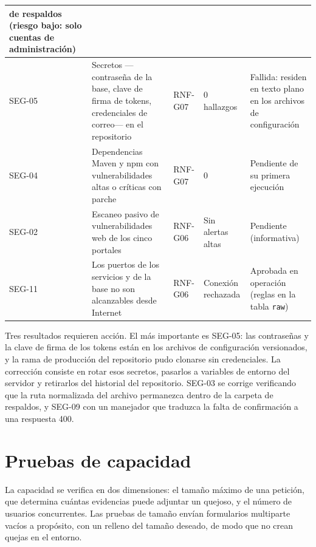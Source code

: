 \begin{longtable}{|p{1.2cm}|L{5.6cm}|L{2.2cm}|L{2.6cm}|L{2.9cm}|}
		de respaldos (riesgo bajo: solo cuentas de administración) \\ \hline
		SEG-05 & Secretos ---contraseña de la base, clave de firma de tokens, credenciales de correo--- en el
		repositorio & RNF-G07 & 0 hallazgos & Fallida: residen en texto plano en los archivos de
		configuración \\ \hline
		SEG-04 & Dependencias Maven y npm con vulnerabilidades altas o críticas con parche & RNF-G07 & 0 &
		Pendiente de su primera ejecución \\ \hline
		SEG-02 & Escaneo pasivo de vulnerabilidades web de los cinco portales & RNF-G06 & Sin alertas
		altas & Pendiente (informativa) \\ \hline
		SEG-11 & Los puertos de los servicios y de la base no son alcanzables desde Internet & RNF-G06 &
		Conexión rechazada & Aprobada en operación (reglas en la tabla \texttt{raw}) \\ \hline
	\end{longtable}
	\normalsize

	Tres resultados requieren acción. El más importante es SEG-05: las contraseñas y la clave de firma
	de los tokens están en los archivos de configuración versionados, y la rama de producción del
	repositorio pudo clonarse sin credenciales. La corrección consiste en rotar esos secretos, pasarlos a
	variables de entorno del servidor y retirarlos del historial del repositorio. SEG-03 se corrige
	verificando que la ruta normalizada del archivo permanezca dentro de la carpeta de respaldos, y SEG-09
	con un manejador que traduzca la falta de confirmación a una respuesta 400.

	\section{Pruebas de capacidad}
	\label{sec:pruebas_capacidad}
	La capacidad se verifica en dos dimensiones: el tamaño máximo de una petición, que determina cuántas
	evidencias puede adjuntar un quejoso, y el número de usuarios concurrentes. Las pruebas de tamaño
	envían formularios multiparte vacíos a propósito, con un relleno del tamaño deseado, de modo que no
	crean quejas en el entorno.


